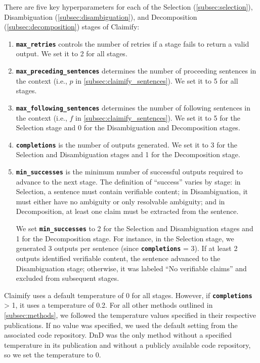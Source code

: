 There are five key hyperparameters for each of the Selection (\autoref{subsec:selection}), Disambiguation (\autoref{subsec:disambiguation}), and Decomposition (\autoref{subsec:decomposition}) stages of Claimify:
\begin{enumerate}
    \item \textbf{\texttt{max\_retries}} controls the number of retries if a stage fails to return a valid output. We set it to 2 for all stages.
    \item \textbf{\texttt{max\_preceding\_sentences}} determines the number of proceeding sentences in the context (i.e., $p$ in \autoref{subsec:claimify_sentences}). We set it to 5 for all stages.
    \item \textbf{\texttt{max\_following\_sentences}} determines the number of following sentences in the context (i.e., $f$ in \autoref{subsec:claimify_sentences}). We set it to 5 for the Selection stage and 0 for the Disambiguation and Decomposition stages.
    \item \textbf{\texttt{completions}} is the number of outputs generated. We set it to 3 for the Selection and Disambiguation stages and 1 for the Decomposition stage.
    \item \textbf{\texttt{min\_successes}} is the minimum number of successful outputs required to advance to the next stage. The definition of ``success'' varies by stage: in Selection, a sentence must contain verifiable content; in Disambiguation, it must either have no ambiguity or only resolvable ambiguity; and in Decomposition, at least one claim must be extracted from the sentence.
    
    We set \texttt{\textbf{min\_successes}} to 2 for the Selection and Disambiguation stages and 1 for the Decomposition stage. For instance, in the Selection stage, we generated 3 outputs per sentence (since \textbf{\texttt{completions}} = 3). If at least 2 outputs identified verifiable content, the sentence advanced to the Disambiguation stage; otherwise, it was labeled ``No verifiable claims'' and excluded from subsequent stages.
\end{enumerate}

Claimify uses a default temperature of 0 for all stages. However, if \texttt{\textbf{completions}} > 1, it uses a temperature of 0.2. For all other methods outlined in \autoref{subsec:methods}, we followed the temperature values specified in their respective publications. If no value was specified, we used the default setting from the associated code repository. DnD was the only method without a specified temperature in its publication and without a publicly available code repository, so we set the temperature to 0.

